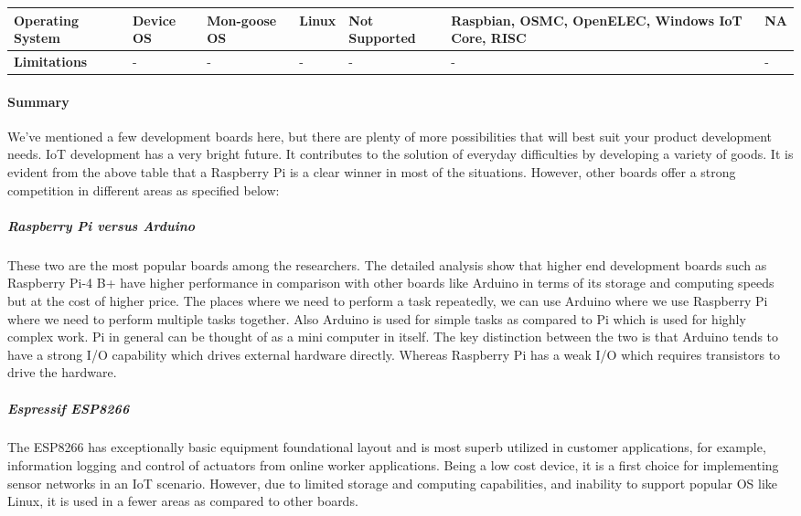 \documentclass[a4paper,11pt]{article}
\begin{document}
\begin{iotsolution}
\begin{center}
\begin{longtable}{|p{2.2cm}|p{1.5cm}|p{1.5cm}|p{2.2cm}|p{2cm}|p{2cm}|p{2cm}|}
   \textbf{Operating System} & Device OS & Mon-goose OS & Linux  & Not Supported & Raspbian, OSMC, OpenELEC, Windows IoT Core, RISC & NA\\
 \hline
\textbf{Limitations} & - & - & - & - & - & -\\
 \hline
 
\end{longtable}

\end{center}


\vspace{20}
\paragraph{\large{Summary}} We've mentioned a few development boards here, but there are plenty of more possibilities that will best suit your product development needs.
IoT development has a very bright future. It contributes to the solution of everyday difficulties by developing a variety of goods. It is evident from the above table that a Raspberry Pi is a clear winner in most of the situations. However, other boards offer a strong competition in different areas as specified below:

\subparagraph{Raspberry Pi versus Arduino}\cite{ar, bb}
These two are the most popular boards among the researchers. The  detailed  
analysis  show  that  higher  end  development  boards  such  as  
Raspberry Pi-4 B+ have higher performance in comparison with 
other  boards  like  Arduino in  terms  of  its  
storage and computing speeds but at the cost of higher price. The places where we need to perform a task repeatedly, we can use Arduino where we use Raspberry Pi where we need to perform multiple tasks together. Also Arduino is used for simple tasks as compared to Pi which is used for highly complex work. Pi in general can be thought of as a mini computer in itself. The key distinction between the two is that Arduino tends to have a strong I/O capability which drives external hardware directly. Whereas Raspberry Pi has a weak I/O which requires transistors to drive the hardware.

\subparagraph{Espressif ESP8266}\cite{are} The ESP8266 has
exceptionally basic equipment foundational layout and is
most superb utilized in customer applications, for example,
information logging and control of actuators from online
worker applications. Being  a  low  cost  device, it  is  a  first  choice  for  implementing 
sensor networks in an IoT scenario. However, due to limited storage and computing capabilities, and inability to support popular OS like Linux, it is used in a fewer areas as compared to other boards. 


\end{iotsolution}
\end{document}
